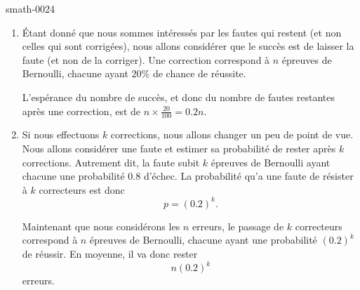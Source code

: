 
\begin{corrige}{smath-0024}

    \begin{enumerate}
        \item
            Étant donné que nous sommes intéressés par les fautes qui restent (et non celles qui sont corrigées), nous allons considérer que le succès est de laisser la faute (et non de la corriger). Une correction correspond à \( n\) épreuves de Bernoulli, chacune ayant \( 20\%\) de chance de réussite.

            L'espérance du nombre de succès, et donc du nombre de fautes restantes après une correction, est de \( n\times \frac{ 20 }{ 100 }=0.2n\).
        \item
            Si nous effectuons \( k\) corrections, nous allons changer un peu de point de vue. Nous allons considérer une faute et estimer sa probabilité de rester après \( k\) corrections. Autrement dit, la faute subit \( k\) épreuves de Bernoulli ayant chacune une probabilité \( 0.8\) d'échec. La probabilité qu'a une faute de résister à \( k\) correcteurs est donc
            \begin{equation}
                p=(0.2)^k.
            \end{equation}
            
            Maintenant que nous considérons les \( n\) erreurs, le passage de \( k\) correcteurs correspond à \( n\) épreuves de Bernoulli, chacune ayant une probabilité \( (0.2)^k\) de réussir. En moyenne, il va donc rester
            \begin{equation}
                n(0.2)^k
            \end{equation}
            erreurs.
    \end{enumerate}

\end{corrige}
